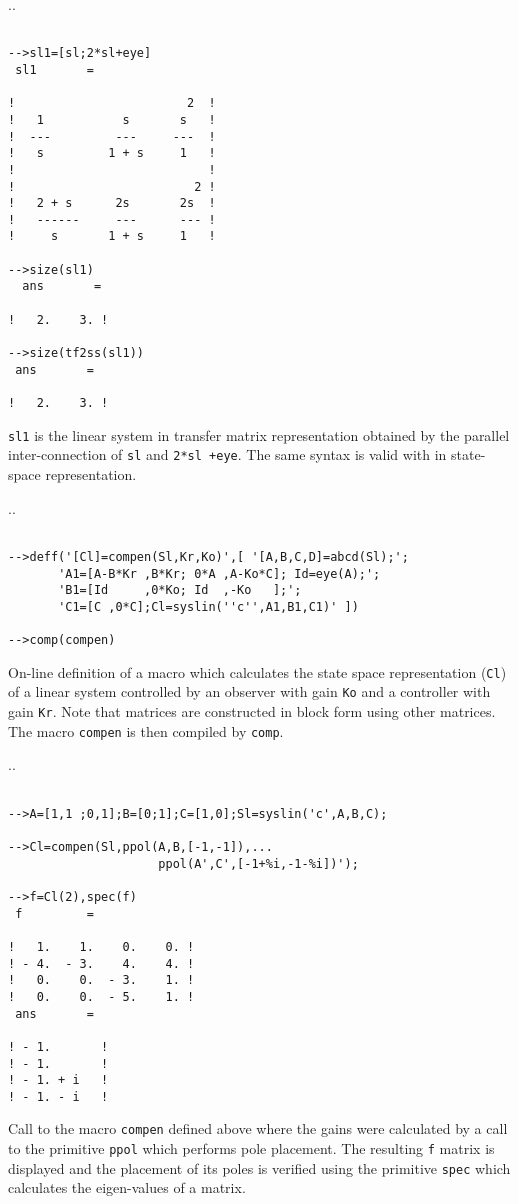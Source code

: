 \noindent.\dotfill.
\begin{verbatim}
 
-->sl1=[sl;2*sl+eye]
 sl1       =
 
!                        2  !
!   1           s       s   !
!  ---         ---     ---  !
!   s         1 + s     1   !
!                           !
!                         2 !
!   2 + s      2s       2s  !
!   ------     ---      --- !
!     s       1 + s     1   !

-->size(sl1)
  ans       =
 
!   2.    3. !

-->size(tf2ss(sl1))
 ans       =
 
!   2.    3. !

\end{verbatim}

{\tt sl1} is the linear system in transfer matrix representation
obtained by the parallel inter-connection of {\tt sl} and {\tt 2*sl +eye}.
The same syntax is valid with {\sl} in state-space representation.

\noindent.\dotfill.
\begin{verbatim}
 
-->deff('[Cl]=compen(Sl,Kr,Ko)',[ '[A,B,C,D]=abcd(Sl);';
       'A1=[A-B*Kr ,B*Kr; 0*A ,A-Ko*C]; Id=eye(A);';
       'B1=[Id     ,0*Ko; Id  ,-Ko   ];';
       'C1=[C ,0*C];Cl=syslin(''c'',A1,B1,C1)' ])
 
-->comp(compen)
\end{verbatim}
On-line definition of a macro which calculates the state space representation
({\tt Cl}) of a linear system controlled by an observer with gain {\tt Ko}
and a controller with gain {\tt Kr}.  Note that matrices are constructed
in block form using other matrices.  The macro {\tt compen} is then
compiled by {\tt comp}.

\noindent.\dotfill.
\begin{verbatim}
 
-->A=[1,1 ;0,1];B=[0;1];C=[1,0];Sl=syslin('c',A,B,C);
 
-->Cl=compen(Sl,ppol(A,B,[-1,-1]),...
                     ppol(A',C',[-1+%i,-1-%i])');
 
-->f=Cl(2),spec(f)
 f         =
 
!   1.    1.    0.    0. !
! - 4.  - 3.    4.    4. !
!   0.    0.  - 3.    1. !
!   0.    0.  - 5.    1. !
 ans       =
 
! - 1.       !
! - 1.       !
! - 1. + i   !
! - 1. - i   !
\end{verbatim}
Call to the macro {\tt compen} defined above where the gains were
calculated by a call to the primitive {\tt ppol} which performs pole
placement.
The resulting {\tt f} matrix is displayed and the placement
of its poles is verified using the primitive {\tt spec} which calculates
the eigen-values of a matrix.

